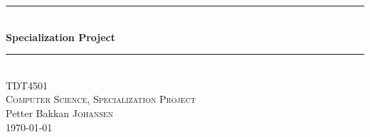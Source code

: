 
\begin{titlepage}


\begin{center} %


\newcommand{\HRule}{\rule{\linewidth}{0.5mm}} %
\begin{figure}[h!tbp]
    \centering
\end{figure}



\HRule \\[0.4cm]
{ \huge \bfseries Specialization Project}\\[0.1cm] %
\HRule \\[1.5cm]
 

\textsc{\Large TDT4501}\\[0.5cm] %
\textsc{\large Computer Science, Specialization Project}\\[0.5cm] %

Petter Bakkan \textsc{Johansen}\\


{\vspace{10mm}\large \today}\\[3cm] %


\end{center}
\end{titlepage}

